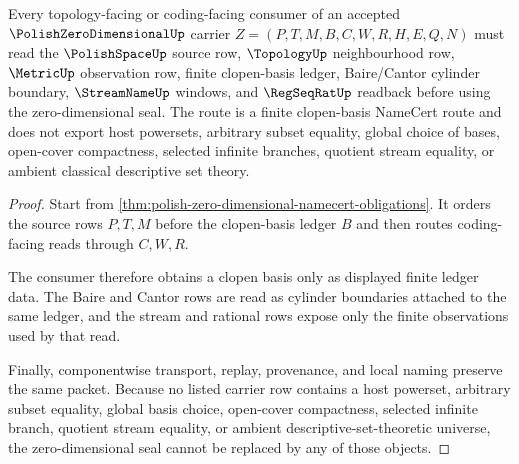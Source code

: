\begin{theorem}
\label{thm:polish-zero-dimensional-clopen-basis-route}
Every topology-facing or coding-facing consumer of an accepted $\PolishZeroDimensionalUp$ carrier $Z=(P,T,M,B,C,W,R,H,E,Q,N)$ must read the $\PolishSpaceUp$ source row, $\TopologyUp$ neighbourhood row, $\MetricUp$ observation row, finite clopen-basis ledger, Baire/Cantor cylinder boundary, $\StreamNameUp$ windows, and $\RegSeqRatUp$ readback before using the zero-dimensional seal. The route is a finite clopen-basis NameCert route and does not export host powersets, arbitrary subset equality, global choice of bases, open-cover compactness, selected infinite branches, quotient stream equality, or ambient classical descriptive set theory.
\end{theorem}
\begin{proof}
Start from \autoref{thm:polish-zero-dimensional-namecert-obligations}. It orders the source rows $P,T,M$ before the clopen-basis ledger $B$ and then routes coding-facing reads through $C,W,R$.

The consumer therefore obtains a clopen basis only as displayed finite ledger data. The Baire and Cantor rows are read as cylinder boundaries attached to the same ledger, and the stream and rational rows expose only the finite observations used by that read.

Finally, componentwise transport, replay, provenance, and local naming preserve the same packet. Because no listed carrier row contains a host powerset, arbitrary subset equality, global basis choice, open-cover compactness, selected infinite branch, quotient stream equality, or ambient descriptive-set-theoretic universe, the zero-dimensional seal cannot be replaced by any of those objects.
\end{proof}


